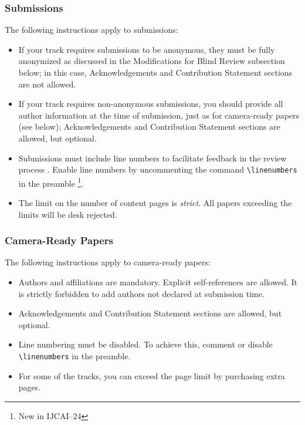 \documentclass{article}
\begin{document}
\subsubsection{Submissions}
The following instructions apply to submissions:
\begin{itemize}
\item If your track requires submissions to be anonymous, they must be fully anonymized as discussed in the Modifications for Blind Review subsection below; in this case, Acknowledgements and Contribution Statement sections are not allowed.

\item If your track requires non-anonymous submissions, you should provide all author information at the time of submission, just as for camera-ready papers (see below); Acknowledgements and Contribution Statement sections are allowed, but optional.

\item Submissions must include line numbers to facilitate feedback in the review process . Enable line numbers by uncommenting the command {\tt \textbackslash{}linenumbers} in the preamble \footnote{New in IJCAI--24}.

\item The limit on the number of  content pages is \emph{strict}. All papers exceeding the limits will be desk rejected.
\end{itemize}

\subsubsection{Camera-Ready Papers}
The following instructions apply to camera-ready papers:

\begin{itemize}
\item Authors and affiliations are mandatory. Explicit self-references are allowed. It is strictly forbidden to add authors not declared at submission time.

\item Acknowledgements and Contribution Statement sections are allowed, but optional.

\item Line numbering must be disabled. To achieve this, comment or disable {\tt \textbackslash{}linenumbers} in the preamble.

\item For some of the tracks, you can exceed the page limit by purchasing extra pages.
\end{itemize}
\end{document}
